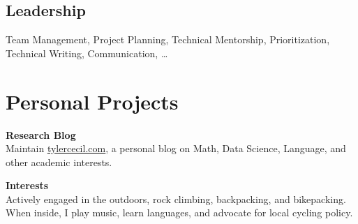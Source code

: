 \documentclass{tc_cv}
\begin{document}
\begin{minipage}[t]{0.3\linewidth}
  \subsection{Leadership}
  Team Management,
  Project Planning,
  Technical Mentorship,
  Prioritization,
  Technical Writing,
  Communication,
  \ldots

  \vspace{1.5em}
  \section{Personal Projects}
  \textbf{Research Blog}\\
  Maintain \href{https://tylercecil.com}{\ul{tylercecil.com}}, a personal blog
  on Math, Data Science, Language, and other academic interests.
  \vspace{0.25em}

  \textbf{Interests}\\
  Actively engaged in the outdoors, rock climbing, backpacking, and
  bikepacking. When inside, I play music, learn languages, and advocate for
  local cycling policy.

\end{minipage}
\hfill\vline\hfill
\end{document}
